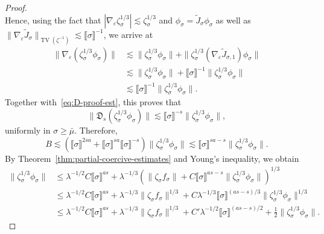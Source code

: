\documentclass{article}
\numberwithin{equation}{section}
\theoremstyle{plain}
\theoremstyle{definition}
\begin{document}
\begin{proof}
\[  \]
  Hence, using the fact that $| \nabla_{\varepsilon} \zeta_{\sigma}^{1 / 3} |
  \lesssim \zeta_{\sigma}^{1 / 3}$ and $\phi_{\sigma} = \tilde{J}_{\sigma}
  \phi_{\sigma}$ as well as $\| \nabla_{\varepsilon} \tilde{J}_{\sigma}
  \|_{\operatorname{TV} (\zeta^{- 1})} \lesssim \llbracket \sigma \rrbracket^{- 1}$,
  we arrive at
  \begin{align*}
    \| \nabla_{\varepsilon}(\zeta_{\sigma}^{1 / 3} \phi_{\sigma}) \|
    &\lesssim \| \zeta_{\sigma}^{1 / 3} \phi_{\sigma} \|
    + \| \zeta_{\sigma}^{1 / 3}
    (\nabla_{\varepsilon} \tilde{J}_{\sigma, 1})\phi_{\sigma} \|\\
    &\lesssim \| \zeta_{\sigma}^{1 / 3} \phi_{\sigma} \|
    + \llbracket \sigma \rrbracket^{- 1}
    \| \zeta_{\sigma}^{1 / 3}\phi_{\sigma} \|\\
    &\lesssim \llbracket \sigma \rrbracket^{- 1}
    \| \zeta_{\sigma}^{1 / 3}\phi_{\sigma} \| .
  \end{align*}
  Together with~\eqref{eq:D-proof-est}, this proves that
  \[ \| \mathfrak{D}_s (\zeta_{\sigma}^{1 / 3} \phi_{\sigma}) \| \lesssim
     \llbracket \sigma \rrbracket^{- s}  \| \zeta_{\sigma}^{1 / 3}
     \phi_{\sigma} \|, \]
  uniformly in $\sigma \geqslant \bar{\mu}$. Therefore,
  \[ B \lesssim (\llbracket \sigma \rrbracket^{2 s a} + \llbracket \sigma
     \rrbracket^{s a} \llbracket \sigma \rrbracket^{- s}) \| \zeta_{\sigma}^{1
     / 3} \phi_{\sigma} \| \lesssim \llbracket \sigma \rrbracket^{s a - s}  \|
     \zeta_{\sigma}^{1 / 3} \phi_{\sigma} \| . \]
  By Theorem~\ref{thm:partial-coercive-estimates} and Young's inequality, we
  obtain
  \[ \begin{aligned}
       \| \zeta_{\sigma}^{1 / 3} \phi_{\sigma} \| & \leqslant  \lambda^{- 1 /
       2} C \llbracket \sigma \rrbracket^{a s} + \lambda^{- 1 / 3} (\|
       \zeta_{\sigma} f_{\sigma} \| + C \llbracket \sigma \rrbracket^{a s - s}
       \| \zeta_{\sigma}^{1 / 3} \phi_{\sigma} \|)^{1 / 3} \\
       & \leqslant  \lambda^{- 1 / 2} C \llbracket \sigma \rrbracket^{a s} +
       \lambda^{- 1 / 3} \| \zeta_{\sigma} f_{\sigma} \|^{1 / 3}  + C
       \lambda^{- 1 / 3} \llbracket \sigma \rrbracket^{(a s - s) / 3} \|
       \zeta_{\sigma}^{1 / 3} \phi_{\sigma} \|^{1 / 3}\\
       & \leqslant  \lambda^{- 1 / 2} C \llbracket \sigma \rrbracket^{a s} +
       \lambda^{- 1 / 3} \| \zeta_{\sigma} f_{\sigma} \|^{1 / 3}  + C'
       \lambda^{- 1 / 2} \llbracket \sigma \rrbracket^{(a s - s) / 2} +
       \frac{1}{2} \| \zeta_{\sigma}^{1 / 3} \phi_{\sigma} \| .

\end{aligned}\]
\end{proof}
\end{document}
